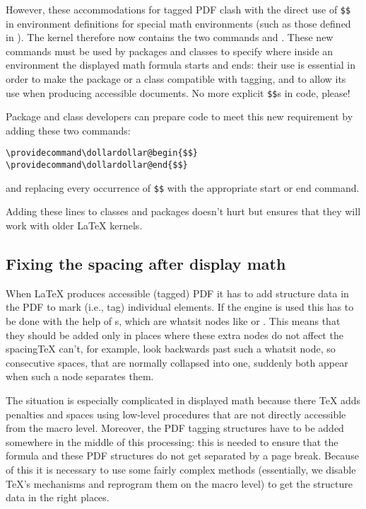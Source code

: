 \documentclass{ltnews}
\providecommand\Dash {\unskip \textemdash}
\providecommand\pdfTeX{\hologo{pdfTeX}}
\begin{document}
However, these accommodations for tagged PDF clash with the direct use
of \verb=$$= in environment definitions for special math environments
(such as those defined in ).  The kernel therefore now
contains the two commands  and
.  These new commands must be used by packages
and classes to specify where inside an environment the displayed math
formula starts and ends: their use is essential in order to make the
package or a class compatible with tagging, and to allow its use when
producing accessible documents.
No more explicit \texttt{\$\$}s in
code, please!

Package and class developers can prepare code to meet
this new requirement by adding these two commands:
\begin{verbatim}
\providecommand\dollardollar@begin{$$}
\providecommand\dollardollar@end{$$}
\end{verbatim}
and replacing every occurrence of \verb=$$= with the appropriate start
or end command.

Adding these  lines to classes and packages doesn't
hurt but ensures that they will work with older \LaTeX{} kernels.



\subsection{Fixing the spacing after display math}

When \LaTeX{} produces accessible (tagged) PDF it has to add structure
data in the PDF to mark (i.e., tag) individual elements. If the
\pdfTeX{} engine is used this has to be done with the help of
s, which are whatsit nodes like  or
. This means that they should be added only in places where
these extra nodes do not affect the spacing\Dash \TeX{} can't, for
example, look backwards past such a whatsit node, so consecutive
spaces, that are normally collapsed into one, suddenly both appear
when such a node separates them.

The situation is especially complicated in displayed math because
there \TeX{} adds penalties and spaces using low-level procedures that
are not directly accessible from the macro level.  Moreover, the PDF
tagging structures have to be added somewhere in the middle of this
processing: this is needed to ensure that the formula and these PDF
structures do not get separated by a page break. Because of this it is
necessary to use some fairly complex methods (essentially, we disable
\TeX's mechanisms and reprogram them on the macro level) to get the
structure data in the right places.
\end{document}
